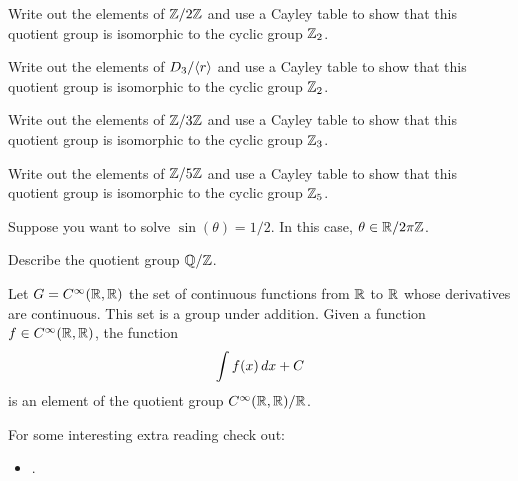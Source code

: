 \documentclass{ximera}
\begin{document}
\begin{exercise}
  Write out the elements of $\mathbb Z/2\mathbb Z$ and use a Cayley table to show
  that this quotient group is isomorphic to the cyclic group $\mathbb Z_2$.
\end{exercise}


\begin{exercise}
  Write out the elements of $D_3/\langle r\rangle$ and use a Cayley table to show
  that this quotient group is isomorphic to the cyclic group $\mathbb Z_2$.
\end{exercise}


\begin{exercise}
  Write out the elements of $\mathbb Z/3\mathbb Z$ and use a Cayley table to show
  that this quotient group is isomorphic to the cyclic group $\mathbb Z_3$.
\end{exercise}


\begin{exercise}
  Write out the elements of $\mathbb Z/5\mathbb Z$ and use a Cayley table to show
  that this quotient group is isomorphic to the cyclic group $\mathbb Z_5$.
\end{exercise}


\begin{example}
  Suppose you want to solve $\sin(\theta) = 1/2$. In this case,
  $\theta \in \mathbb R/2\pi\mathbb Z$.
\end{example}

\begin{exercise}
  Describe the quotient group $\mathbb Q/\mathbb Z$.
\end{exercise}

\begin{example}[Antiderivatives]
  Let $G= C^\infty(\mathbb R,\mathbb R)$ the set of continuous functions from $\mathbb R$
  to $\mathbb R$ whose derivatives are continuous. This set is a group under
  addition. Given a function $f\in C^\infty(\mathbb R,\mathbb R)$, the function
  \[
  \int f(x) \, d x + C
  \]
  is an element of the quotient group $C^\infty(\mathbb R,\mathbb R)/\mathbb R$.
\end{example}





For some interesting extra reading check out:
\begin{itemize}
\item {}.
\end{itemize}
\end{document}
